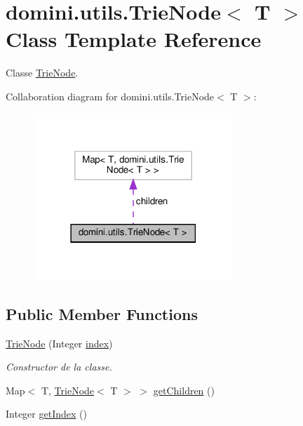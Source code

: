 \hypertarget{classdomini_1_1utils_1_1TrieNode}{}\section{domini.\+utils.\+Trie\+Node$<$ T $>$ Class Template Reference}
\label{classdomini_1_1utils_1_1TrieNode}


Classe \hyperlink{classdomini_1_1utils_1_1TrieNode}{Trie\+Node}.  




Collaboration diagram for domini.\+utils.\+Trie\+Node$<$ T $>$\+:\nopagebreak
\begin{figure}[H]
\begin{center}
\leavevmode
\includegraphics[width=213pt]{classdomini_1_1utils_1_1TrieNode__coll__graph}
\end{center}
\end{figure}
\subsection*{Public Member Functions}
\begin{DoxyCompactItemize}
\item 
\hyperlink{classdomini_1_1utils_1_1TrieNode_af9a18353151b5e3dea5966f50629319a}{Trie\+Node} (Integer \hyperlink{classdomini_1_1utils_1_1TrieNode_a9c247bc6568131e5e6ad0758adb67bfa}{index})
\begin{DoxyCompactList}\small\item\em Constructor de la classe. \end{DoxyCompactList}\item 
Map$<$ T, \hyperlink{classdomini_1_1utils_1_1TrieNode}{Trie\+Node}$<$ T $>$ $>$ \hyperlink{classdomini_1_1utils_1_1TrieNode_ace4e12a6dd51d77d6d24447eca520478}{get\+Children} ()
\item 
Integer \hyperlink{classdomini_1_1utils_1_1TrieNode_ac8e79df6ce5e7b33c6d08a0fe0681916}{get\+Index} ()
\end{DoxyCompactItemize}
